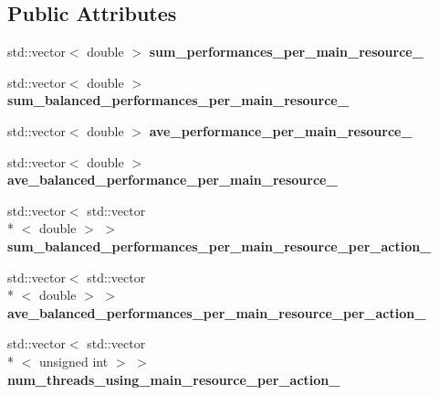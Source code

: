 \subsection*{Public Attributes}
\begin{DoxyCompactItemize}
\item 
\hypertarget{structStruct__OverallPerformance_ab93f96f56b1c50775e2899a164a15da3}{std\-::vector$<$ double $>$ {\bfseries sum\-\_\-performances\-\_\-per\-\_\-main\-\_\-resource\-\_\-}}\label{structStruct__OverallPerformance_ab93f96f56b1c50775e2899a164a15da3}

\item 
\hypertarget{structStruct__OverallPerformance_a1f97ba922669b0ee8a71a6a7839e69ed}{std\-::vector$<$ double $>$ {\bfseries sum\-\_\-balanced\-\_\-performances\-\_\-per\-\_\-main\-\_\-resource\-\_\-}}\label{structStruct__OverallPerformance_a1f97ba922669b0ee8a71a6a7839e69ed}

\item 
\hypertarget{structStruct__OverallPerformance_a872e5ba2ae6de73c681aa426a2f115c4}{std\-::vector$<$ double $>$ {\bfseries ave\-\_\-performance\-\_\-per\-\_\-main\-\_\-resource\-\_\-}}\label{structStruct__OverallPerformance_a872e5ba2ae6de73c681aa426a2f115c4}

\item 
\hypertarget{structStruct__OverallPerformance_ac72bab23968737727e9e655e500d4426}{std\-::vector$<$ double $>$ {\bfseries ave\-\_\-balanced\-\_\-performance\-\_\-per\-\_\-main\-\_\-resource\-\_\-}}\label{structStruct__OverallPerformance_ac72bab23968737727e9e655e500d4426}

\item 
\hypertarget{structStruct__OverallPerformance_a119209ab011e556f03ecfe79b0504d73}{std\-::vector$<$ std\-::vector\\*
$<$ double $>$ $>$ {\bfseries sum\-\_\-balanced\-\_\-performances\-\_\-per\-\_\-main\-\_\-resource\-\_\-per\-\_\-action\-\_\-}}\label{structStruct__OverallPerformance_a119209ab011e556f03ecfe79b0504d73}

\item 
\hypertarget{structStruct__OverallPerformance_a451e116ad8e1a5528757ddaa4c6b8815}{std\-::vector$<$ std\-::vector\\*
$<$ double $>$ $>$ {\bfseries ave\-\_\-balanced\-\_\-performances\-\_\-per\-\_\-main\-\_\-resource\-\_\-per\-\_\-action\-\_\-}}\label{structStruct__OverallPerformance_a451e116ad8e1a5528757ddaa4c6b8815}

\item 
\hypertarget{structStruct__OverallPerformance_aaef2ec8af207e3ab7ec22aacbf6c6148}{std\-::vector$<$ std\-::vector\\*
$<$ unsigned int $>$ $>$ {\bfseries num\-\_\-threads\-\_\-using\-\_\-main\-\_\-resource\-\_\-per\-\_\-action\-\_\-}}\label{structStruct__OverallPerformance_aaef2ec8af207e3ab7ec22aacbf6c6148}


\end{DoxyCompactItemize}
